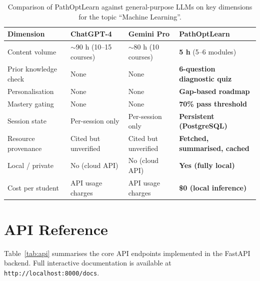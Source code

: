 \documentclass[12pt,a4paper]{article}
\begin{document}
\begin{table}[H]
  \centering
  \caption{Comparison of PathOptLearn against general-purpose LLMs on key
  dimensions for the topic ``Machine Learning''.}
  \label{tab:llmcomparison}
  \begin{tabularx}{\textwidth}{@{}lXXX@{}}
    \toprule
    \textbf{Dimension} & \textbf{ChatGPT-4} & \textbf{Gemini Pro} & \textbf{PathOptLearn} \\
    \midrule
    Content volume       & $\sim$90 h (10--15 courses) & $\sim$80 h (10 courses) & \textbf{5 h} (5--6 modules) \\
    Prior knowledge check & None & None & \textbf{6-question diagnostic quiz} \\
    Personalisation       & None & None & \textbf{Gap-based roadmap} \\
    Mastery gating        & None & None & \textbf{70\% pass threshold} \\
    Session state         & Per-session only & Per-session only & \textbf{Persistent (PostgreSQL)} \\
    Resource provenance   & Cited but unverified & Cited but unverified & \textbf{Fetched, summarised, cached} \\
    Local / private       & No (cloud API) & No (cloud API) & \textbf{Yes (fully local)} \\
    Cost per student      & API usage charges & API usage charges & \textbf{\$0 (local inference)} \\
    \bottomrule
  \end{tabularx}
\end{table}

\section{API Reference}

Table~\ref{tab:api} summarises the core API endpoints implemented in the
FastAPI backend. Full interactive documentation is available at
\texttt{http://localhost:8000/docs}.
\end{document}
